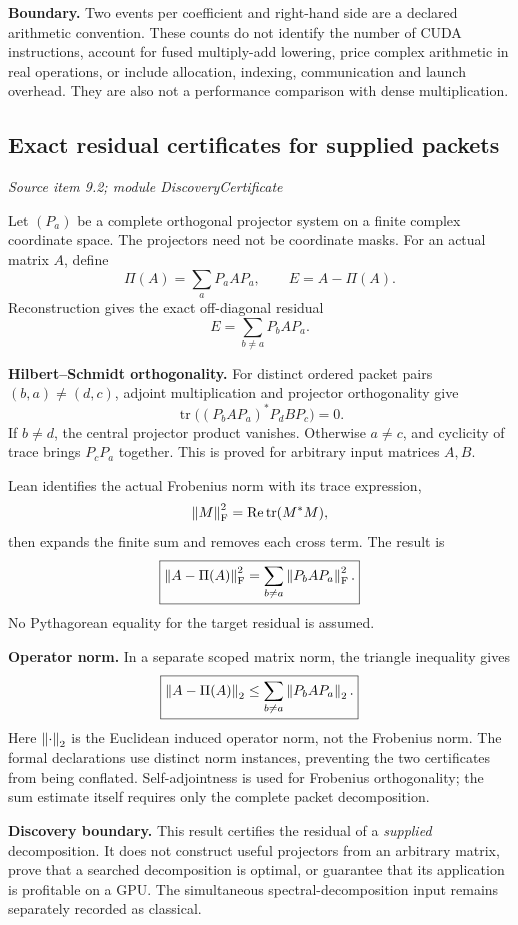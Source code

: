 \textbf{Boundary.} Two events per coefficient and right-hand side are a declared arithmetic convention. These counts do not identify the number of CUDA instructions, account for fused multiply-add lowering, price complex arithmetic in real operations, or include allocation, indexing, communication and launch overhead. They are also not a performance comparison with dense multiplication.



\subsection{Exact residual certificates for supplied packets}\label{supp5:subsection:005}\textit{Source item 9.2; module DiscoveryCertificate}\par
Let $(P_a)$ be a complete orthogonal projector system on a finite complex coordinate space. The projectors need not be coordinate masks. For an actual matrix $A$, define
\[
\Pi(A)=\sum_aP_aAP_a,
\qquad E=A-\Pi(A).
\]
Reconstruction gives the exact off-diagonal residual
\[
E=\sum_{b\ne a}P_bAP_a.
\]

\textbf{Hilbert--Schmidt orthogonality.} For distinct ordered packet pairs $(b,a)\ne(d,c)$, adjoint multiplication and projector orthogonality give
\[
\operatorname{tr}\bigl((P_bAP_a)^*P_dBP_c\bigr)=0.
\]
If $b\ne d$, the central projector product vanishes. Otherwise $a\ne c$, and cyclicity of trace brings $P_cP_a$ together. This is proved for arbitrary input matrices $A,B$.

Lean identifies the actual Frobenius norm with its trace expression,
\[
\left\lVert M\right\rVert_{\rm F}^2=\operatorname{Re}\operatorname{tr}(M^*M),
\]
then expands the finite sum and removes each cross term. The result is
\[
\boxed{\left\lVert A-\Pi(A)\right\rVert_{\rm F}^2
=\sum_{b\ne a}\left\lVert P_bAP_a\right\rVert_{\rm F}^2.}
\]
No Pythagorean equality for the target residual is assumed.

\textbf{Operator norm.} In a separate scoped matrix norm, the triangle inequality gives
\[
\boxed{\left\lVert A-\Pi(A)\right\rVert_2
\leq\sum_{b\ne a}\left\lVert P_bAP_a\right\rVert_2.}
\]
Here $\left\lVert\cdot\right\rVert_2$ is the Euclidean induced operator norm, not the Frobenius norm. The formal declarations use distinct norm instances, preventing the two certificates from being conflated. Self-adjointness is used for Frobenius orthogonality; the sum estimate itself requires only the complete packet decomposition.

\textbf{Discovery boundary.} This result certifies the residual of a \emph{supplied} decomposition. It does not construct useful projectors from an arbitrary matrix, prove that a searched decomposition is optimal, or guarantee that its application is profitable on a GPU. The simultaneous spectral-decomposition input remains separately recorded as classical.



